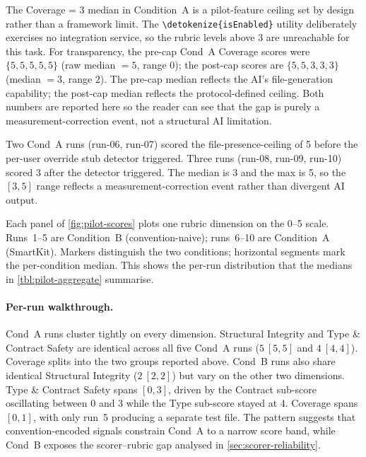 \documentclass[12pt,a4paper]{report}
\newcommand{\code}[1]{\texttt{\nolinkurl{\detokenize{#1}}}}
\begin{document}
The Coverage = 3 median in Condition~A is a pilot-feature ceiling set by design rather than a framework limit. The \code{isEnabled} utility deliberately exercises no integration service, so the rubric levels above 3 are unreachable for this task. For transparency, the pre-cap Cond~A Coverage scores were $\{5, 5, 5, 5, 5\}$ (raw median $=5$, range $0$); the post-cap scores are $\{5, 5, 3, 3, 3\}$ (median $=3$, range $2$). The pre-cap median reflects the AI's file-generation capability; the post-cap median reflects the protocol-defined ceiling. Both numbers are reported here so the reader can see that the gap is purely a measurement-correction event, not a structural AI limitation.

Two Cond~A runs (run-06, run-07) scored the file-presence-ceiling of 5 before the per-user override stub detector triggered. Three runs (run-08, run-09, run-10) scored 3 after the detector triggered. The median is 3 and the max is 5, so the $[3, 5]$ range reflects a measurement-correction event rather than divergent AI output.



Each panel of \autoref{fig:pilot-scores} plots one rubric dimension on the 0--5 scale. Runs~1--5 are Condition~B (convention-naive); runs~6--10 are Condition~A (SmartKit). Markers distinguish the two conditions; horizontal segments mark the per-condition median. This shows the per-run distribution that the medians in \autoref{tbl:pilot-aggregate} summarise.

\paragraph{Per-run walkthrough.}
Cond~A runs cluster tightly on every dimension. Structural Integrity and Type \& Contract Safety are identical across all five Cond~A runs ($5\ [5, 5]$ and $4\ [4, 4]$). Coverage splits into the two groups reported above. Cond~B runs also share identical Structural Integrity ($2\ [2, 2]$) but vary on the other two dimensions. Type \& Contract Safety spans $[0, 3]$, driven by the Contract sub-score oscillating between 0 and 3 while the Type sub-score stayed at 4. Coverage spans $[0, 1]$, with only run~5 producing a separate test file. The pattern suggests that convention-encoded signals constrain Cond~A to a narrow score band, while Cond~B exposes the scorer--rubric gap analysed in \autoref{sec:scorer-reliability}.
\end{document}
